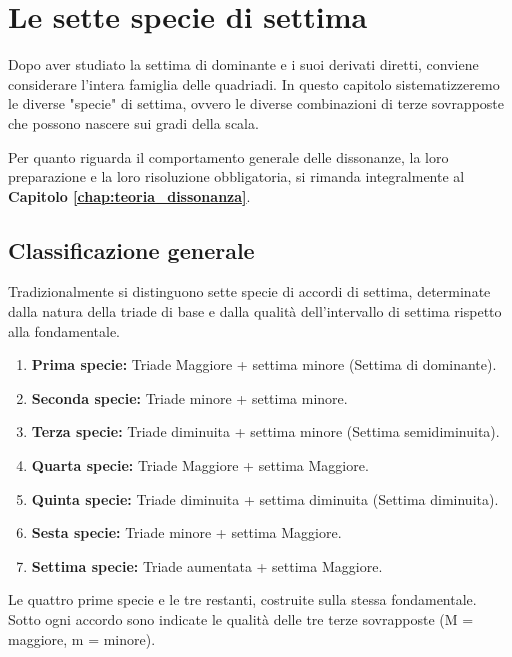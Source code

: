 \chapter{Le sette specie di settima}
\label{chap:sette_specie}

Dopo aver studiato la settima di dominante e i suoi derivati diretti, conviene considerare l'intera famiglia delle quadriadi. In questo capitolo sistematizzeremo le diverse "specie" di settima, ovvero le diverse combinazioni di terze sovrapposte che possono nascere sui gradi della scala.

Per quanto riguarda il comportamento generale delle dissonanze, la loro preparazione e la loro risoluzione obbligatoria, si rimanda integralmente al \textbf{Capitolo \ref{chap:teoria_dissonanza}}.

\section{Classificazione generale}
\label{sec:classificazione_specie}

Tradizionalmente si distinguono sette specie di accordi di settima, determinate dalla natura della triade di base e dalla qualità dell'intervallo di settima rispetto alla fondamentale.

\begin{enumerate}
    \item \textbf{Prima specie:} Triade Maggiore + settima minore (Settima di dominante).
    \item \textbf{Seconda specie:} Triade minore + settima minore.
    \item \textbf{Terza specie:} Triade diminuita + settima minore (Settima semidiminuita).
    \item \textbf{Quarta specie:} Triade Maggiore + settima Maggiore.
    \item \textbf{Quinta specie:} Triade diminuita + settima diminuita (Settima diminuita).
    \item \textbf{Sesta specie:} Triade minore + settima Maggiore.
    \item \textbf{Settima specie:} Triade aumentata + settima Maggiore.
\end{enumerate}

\begin{esempio}
	\label{ex:sette_specie}
	Le quattro prime specie e le tre restanti, costruite sulla stessa fondamentale. Sotto ogni accordo sono indicate le qualità delle tre terze sovrapposte (M = maggiore, m = minore).
\end{esempio}

